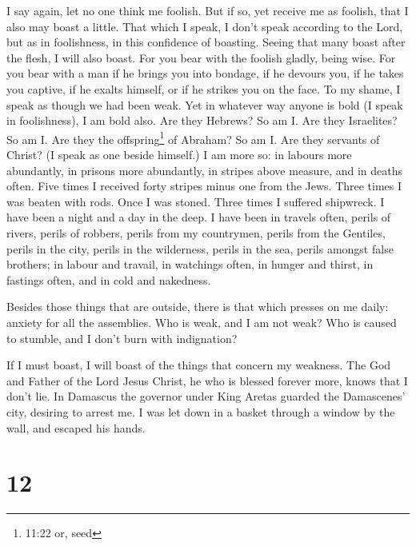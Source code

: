  I say again, let no one think me foolish. But if so, yet
receive me as foolish, that I also may boast a little. 
That which I speak, I don't speak according to the Lord, but as in
foolishness, in this confidence of boasting.  Seeing that
many boast after the flesh, I will also boast.  For you
bear with the foolish gladly, being wise.  For you bear
with a man if he brings you into bondage, if he devours you, if he takes
you captive, if he exalts himself, or if he strikes you on the face.
 To my shame, I speak as though we had been weak. Yet in
whatever way anyone is bold (I speak in foolishness), I am bold also.
 Are they Hebrews? So am I. Are they Israelites? So am I.
Are they the offspring\footnote{11:22 or, seed} of Abraham? So am I.
 Are they servants of Christ? (I speak as one beside
himself.) I am more so: in labours more abundantly, in prisons more
abundantly, in stripes above measure, and in deaths often. 
Five times I received forty stripes minus one from the Jews.
 Three times I was beaten with rods. Once I was stoned.
Three times I suffered shipwreck. I have been a night and a day in the
deep.  I have been in travels often, perils of rivers,
perils of robbers, perils from my countrymen, perils from the Gentiles,
perils in the city, perils in the wilderness, perils in the sea, perils
amongst false brothers;  in labour and travail, in
watchings often, in hunger and thirst, in fastings often, and in cold
and nakedness.

 Besides those things that are outside, there is that which
presses on me daily: anxiety for all the assemblies.  Who
is weak, and I am not weak? Who is caused to stumble, and I don't burn
with indignation?

 If I must boast, I will boast of the things that concern
my weakness.  The God and Father of the Lord Jesus Christ,
he who is blessed forever more, knows that I don't lie.  In
Damascus the governor under King Aretas guarded the Damascenes' city,
desiring to arrest me.  I was let down in a basket through
a window by the wall, and escaped his hands.

\hypertarget{section-11}{%
\section{12}\label{section-11}}

